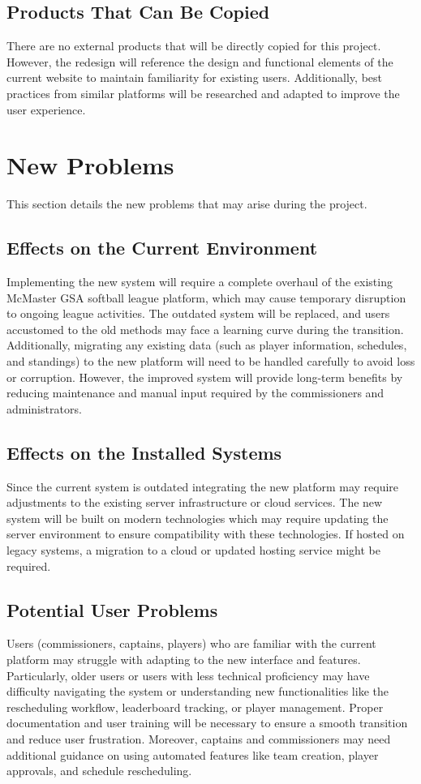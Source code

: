 \documentclass[12pt, titlepage]{article}
\begin{document}
\subsection{Products That Can Be Copied}
There are no external products that will be directly copied for this project. However, the redesign will reference the design and functional elements of the current website to maintain familiarity for existing users. Additionally, best practices from similar platforms will be researched and adapted to improve the user experience.


\section{New Problems}
This section details the new problems that may arise during the project.
\subsection{Effects on the Current Environment}
Implementing the new system will require a complete overhaul of the existing McMaster GSA softball league platform, which may cause temporary disruption to ongoing league activities. The outdated system will be replaced, and users accustomed to the old methods may face a learning curve during the transition. Additionally, migrating any existing data (such as player information, schedules, and standings) to the new platform will need to be handled carefully to avoid loss or corruption. However, the improved system will provide long-term benefits by reducing maintenance and manual input required by the commissioners and administrators. 
\subsection{Effects on the Installed Systems}
Since the current system is outdated integrating the new platform may require adjustments to the existing server infrastructure or cloud services. The new system will be built on modern technologies which may require updating the server environment to ensure compatibility with these technologies. If hosted on legacy systems, a migration to a cloud or updated hosting service might be required.
\subsection{Potential User Problems}
Users (commissioners, captains, players) who are familiar with the current platform may struggle with adapting to the new interface and features. Particularly, older users or users with less technical proficiency may have difficulty navigating the system or understanding new functionalities like the rescheduling workflow, leaderboard tracking, or player management. Proper documentation and user training will be necessary to ensure a smooth transition and reduce user frustration. Moreover, captains and commissioners may need additional guidance on using automated features like team creation, player approvals, and schedule rescheduling.
\end{document}
